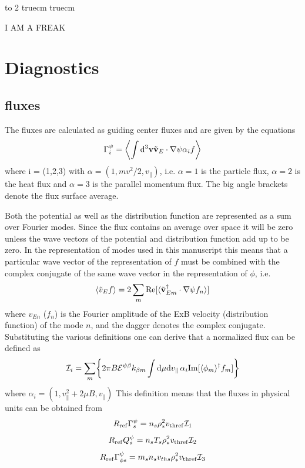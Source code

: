 \documentclass{report}
\def\be{\begin{equation}}
\def\ee{\end{equation}}
\begin{document}
\cleardoublepage 


\vfill \eject 
\hbox to 2 truecm{\hfill}
 truecm 

\centerline{\selectfont \Huge I AM A FREAK} 

\vfill  \eject 


\chapter{Diagnostics} 

\section{fluxes} %
\label{fluxes}

The fluxes are calculated as guiding center fluxes and are given by the equations 
\be 
\Gamma_i^\psi  = \biggl \langle \int {\rm d}^3 {\bf v} \tilde {\bf v}_E\cdot \nabla \psi  \alpha_i f \biggr \rangle 
\ee
where i = (1,2,3) with $\alpha = (1, mv^2/2,v_\parallel)$, i.e. $\alpha = 1$ is the 
particle flux, $\alpha = 2$ is the heat flux and $\alpha = 3$ is the parallel momentum 
flux. The big angle brackets denote the flux surface average. 

Both the potential as well as the distribution function are represented as a sum over 
Fourier modes. Since the flux contains an average over space it will be zero unless 
the wave vectors of the potential and distribution function add up to be zero. In the 
representation of modes used in this manuscript this means that a particular wave 
vector of the representation of $f$ must be combined with the complex conjugate of 
the same wave vector in the representation of $\phi$, i.e.  
\be 
\langle \tilde v_E f \rangle  = 2 \sum_m {\rm Re}  [ \langle \tilde {\bf v}_{Em}^\dagger 
\cdot \nabla \psi  f_n \rangle ]  
\ee 
where $v_{En}$ ($f_n$) is the Fourier amplitude of the ExB velocity (distribution function) 
of the mode $n$, and the dagger denotes the complex conjugate. Substituting the 
various definitions one can derive that a normalized flux can be defined as 
\be 
{\cal I}_i = \sum_m \biggl \{ 2 \pi B {\cal E}^{\psi \beta} k_{\beta m } \int {\rm d} 
\mu {\rm d} v_{\parallel} \,  \alpha_i {\rm Im} [ \langle \phi_m \rangle^\dagger f_m ] \biggr \}
\ee
where $\alpha_i = (1, v_\parallel^2 + 2 \mu B,v_\parallel)$  
This definition means that the fluxes in physical units can be obtained from 
\be 
R_{\rm ref} \Gamma^\psi_s  = n_s \rho_*^2 v_{\rm thref} {\cal I}_1 
\ee 
\be 
R_{\rm ref} Q_s^\psi = n_s T_s \rho_*^2 v_{\rm thref} {\cal I}_2 
\ee 
\be 
R_{\rm ref} \Gamma^\psi_{\phi s} = m_s n_s v_{ths} \rho_*^2 v_{\rm thref} {\cal I}_3   
\ee
\end{document}
